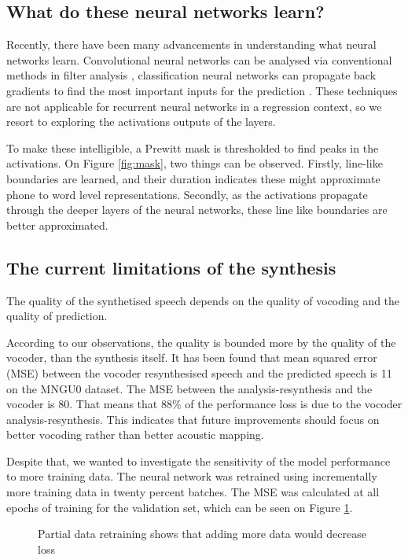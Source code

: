 \documentclass[a4paper]{article}
\begin{document}
\subsection{What do these neural networks learn?} \label{section:visualisation}

Recently, there have been many advancements in understanding what neural networks learn.
Convolutional neural networks can be analysed via conventional methods in filter analysis \cite{Palaz2015},
classification neural networks can propagate back gradients to find the most important inputs for
the prediction \cite{Selvaraju2017}. These techniques are not applicable for recurrent neural networks in a regression
context, so we resort to exploring the activations outputs of the layers.

To make these intelligible, a Prewitt mask is thresholded to find peaks in the activations.
On Figure \ref{fig:mask}, two things can be observed. Firstly, line-like boundaries are learned, and their duration indicates these might approximate phone to word level representations. Secondly, as the activations propagate through the deeper layers of the neural networks, these line like boundaries are better approximated.

\subsection{The current limitations of the synthesis} \label{section:limitations}
The quality of the synthetised speech depends on the quality of vocoding and
the quality of prediction.

According to our observations, the quality is bounded more by the
quality of the vocoder, than the synthesis itself. It has been found that mean squared error (MSE) between the vocoder resynthesised speech and the predicted speech is 11 on the MNGU0 dataset. The MSE between the analysis-resynthesis and the vocoder is 80. That means that 88\% of the performance loss
is due to the vocoder analysis-resynthesis. This indicates that
future improvements should focus on better vocoding rather than better
acoustic mapping.

Despite that, we wanted to investigate the sensitivity of the model performance to more
training data. The neural network was retrained using incrementally more training data in twenty
percent batches. The MSE was calculated at all epochs of training for the validation set, which
can be seen on Figure \ref{learning_curve}.

\begin{figure}[t]
  \begin{center}
    \scalebox{0.50}{}
    \caption{Partial data retraining shows that adding more data would
      decrease loss}
      \label{learning_curve}
\end{center}
\end{figure}
\end{document}
